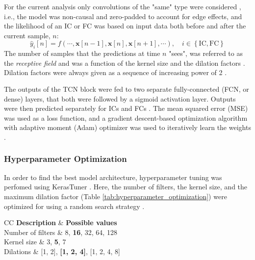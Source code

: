 \documentclass[sensors,article,submit,pdftex,moreauthors]{Definitions/mdpi}
\begin{document}
For the current analysis only convolutions of the "same" type were considered \cite{Remy2020}, i.e., the model was non-causal and zero-padded to account for edge effects, and the likelihood of an IC or FC was based on input data both before and after the current sample, $n$:
\begin{equation}
	\hat{y}_{i}[n] = f\left(\cdots, \mathbf{x}[n-1], \mathbf{x}[n], \mathbf{x}[n+1], \cdots \right), \quad i \in \left\{ \mathrm{IC}, \mathrm{FC}\right\}
\end{equation}
The number of samples that the predictions at time $n$ "sees", was referred to as the \emph{receptive field} \cite{Lea2017} and was a function of the kernel size and the dilation factors \cite{Remy2020}. Dilation factors were always given as a sequence of increasing power of 2 \cite{YuKoltun2016,Bai2018,VanDenOord2016}.

The outputs of the TCN block were fed to two separate fully-connected (FCN, or dense) layers, that both were followed by a sigmoid activation layer. Outputs were then predicted separately for ICs and FCs \cite{Gadaleta2019,Filtjens2020}. The mean squared error (MSE) was used as a loss function, and a gradient descent-based optimization algorithm with adaptive moment (Adam) optimizer was used to iteratively learn the weights \cite{Kingma2014,Schmidt2021}.

\subsubsection{Hyperparameter Optimization}
In order to find the best model architecture, hyperparameter tuning was perfomed using KerasTuner \cite{OMalley2019}. Here, the number of filters, the kernel size, and the maximum dilation factor (Table \ref{tab:hyperparameter_optimization}) were optimized for using a random search strategy \cite{Bergstra2012}.

\begin{table}[H] 
	\caption{Model hyperparameters that were optimized for, and the corresponding sets of possible values.\label{tab:hyperparameter_optimization}}
	\begin{tabularx}{\textwidth}{CC}
		\toprule
		\textbf{Description}	& \textbf{Possible values}\\
		\midrule
		Number of filters	& 8, {\bf 16}, 32, 64, 128\\
		Kernel size			& 3, {\bf 5}, 7\\
		Dilations 			& [1, 2], {\bf [1, 2, 4]}, [1, 2, 4, 8]\\
		\bottomrule
	\end{tabularx}
\end{table}
\end{document}
